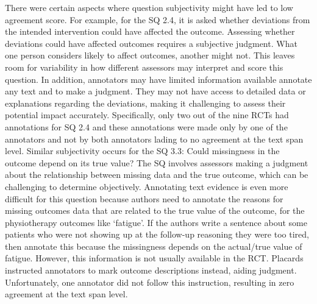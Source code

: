 \documentclass[sn-mathphys,Numbered]{sn-jnl}%
\theoremstyle{thmstyleone}%
\theoremstyle{thmstyletwo}%
\theoremstyle{thmstylethree}%
\begin{document}
There were certain aspects where question subjectivity might have led to low agreement score.
For example, for the SQ 2.4, it is asked whether deviations from the intended intervention could have affected the outcome.
Assessing whether deviations could have affected outcomes requires a subjective judgment.
What one person considers likely to affect outcomes, another might not.
This leaves room for variability in how different assessors may interpret and score this question.
In addition, annotators may have limited information available annotate any text and to make a judgment.
They may not have access to detailed data or explanations regarding the deviations, making it challenging to assess their potential impact accurately.
Specifically, only two out of the nine RCTs had annotations for SQ 2.4 and these annotations were made only by one of the annotators and not by both annotators lading to no agreement at the text span level.
Similar subjectivity occurs for the SQ 3.3: Could missingness in the outcome depend on its true value?
The SQ involves assessors making a judgment about the relationship between missing data and the true outcome, which can be challenging to determine objectively.
Annotating text evidence is even more difficult for this question because authors need to annotate the reasons for missing outcomes data that are related to the true value of the outcome, for the physiotherapy outcomes like `fatigue'.
If the authors write a sentence about some patients who were not showing up at the follow-up reasoning they were too tired, then annotate this because the missingness depends on the actual/true value of fatigue.
However, this information is not usually available in the RCT.
Placards instructed annotators to mark outcome descriptions instead, aiding judgment.
Unfortunately, one annotator did not follow this instruction, resulting in zero agreement at the text span level.
%
%
%
\end{document}
